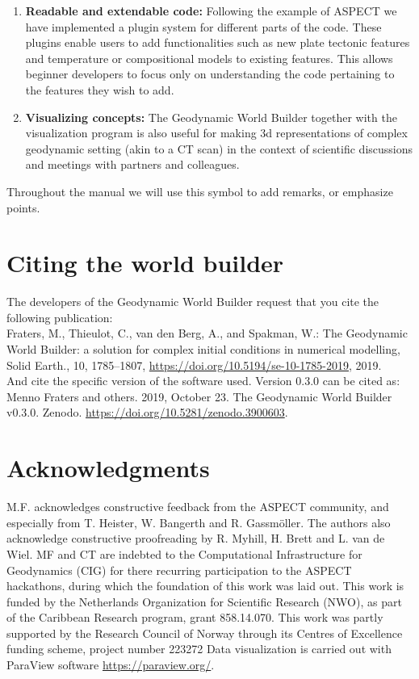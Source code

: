 \documentclass{book}
\newcommand{\GWB}{{Geodynamic World Builder}}
\newcommand{\aspect}{{ASPECT}}
\begin{document}
\begin{enumerate}
    \item {\bf Readable and extendable code:} Following the example of \aspect{} we have implemented a plugin system for different parts of the code. These plugins enable users to add functionalities such as new plate tectonic features and temperature or compositional models to existing features. This allows beginner developers to focus only on understanding the code pertaining to the features they wish to add. 
    
    \item {\bf Visualizing concepts:} The \GWB{} together with the visualization program is also useful for making 3d representations of complex geodynamic setting (akin to a CT scan) in the context of scientific discussions and meetings with partners and colleagues. 
\end{enumerate}

\begin{remark}
Throughout the manual we will use this symbol to add remarks, or emphasize points.
\end{remark}


\section{Citing the world builder}
The developers of the Geodynamic World Builder request that you cite the following publication:\\

\noindent Fraters, M., Thieulot, C., van den Berg, A., and Spakman, W.: The Geodynamic World Builder: a solution for complex initial conditions in numerical modelling, Solid Earth., 10, 1785–1807, \url{https://doi.org/10.5194/se-10-1785-2019}, 2019.\\

\noindent And cite the specific version of the software used. Version 0.3.0 can be cited as:\\

\noindent Menno Fraters and others. 2019, October 23. The Geodynamic World Builder v0.3.0. Zenodo. \url{https://doi.org/10.5281/zenodo.3900603}.


\section{Acknowledgments}
M.F. acknowledges constructive feedback from the ASPECT community, and especially from T. Heister, W. Bangerth and R. Gassm\"oller. The authors also acknowledge constructive proofreading by R. Myhill, H. Brett and L. van de Wiel. MF and CT are indebted to the Computational Infrastructure for Geodynamics (CIG) for there recurring participation to the ASPECT hackathons, during which the foundation of this work was laid out.
This work is funded by the Netherlands Organization for Scientific Research (NWO), as part of the Caribbean Research program, grant 858.14.070. This work was partly supported by the Research Council of Norway through its Centres of Excellence funding scheme, project number 223272
Data visualization is carried out with ParaView software \url{https://paraview.org/}.
\end{document}
